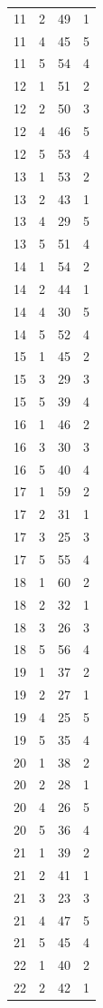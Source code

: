 \documentclass[a4paper, amsfonts, amssymb, amsmath, reprint, showkeys, nofootinbib, twoside]{revtex4-1}
\begin{document}
\begin{longtable}[h!]{ cccc }
	11 & 2 & 49 & 1 \\
	11 & 4 & 45 & 5 \\
	11 & 5 & 54 & 4 \\
	12 & 1 & 51 & 2 \\
	12 & 2 & 50 & 3 \\
	12 & 4 & 46 & 5 \\
	12 & 5 & 53 & 4 \\
	13 & 1 & 53 & 2 \\
	13 & 2 & 43 & 1 \\
	13 & 4 & 29 & 5 \\
	13 & 5 & 51 & 4 \\
	14 & 1 & 54 & 2 \\
	14 & 2 & 44 & 1 \\
	14 & 4 & 30 & 5 \\
	14 & 5 & 52 & 4 \\
	15 & 1 & 45 & 2 \\
	15 & 3 & 29 & 3 \\
	15 & 5 & 39 & 4 \\
	16 & 1 & 46 & 2 \\
	16 & 3 & 30 & 3 \\
	16 & 5 & 40 & 4 \\
	17 & 1 & 59 & 2 \\
	17 & 2 & 31 & 1 \\
	17 & 3 & 25 & 3 \\
	17 & 5 & 55 & 4 \\
	18 & 1 & 60 & 2 \\
	18 & 2 & 32 & 1 \\
	18 & 3 & 26 & 3 \\
	18 & 5 & 56 & 4 \\
	19 & 1 & 37 & 2 \\
	19 & 2 & 27 & 1 \\
	19 & 4 & 25 & 5 \\
	19 & 5 & 35 & 4 \\
	20 & 1 & 38 & 2 \\
	20 & 2 & 28 & 1 \\
	20 & 4 & 26 & 5 \\
	20 & 5 & 36 & 4 \\
	21 & 1 & 39 & 2 \\
	21 & 2 & 41 & 1 \\
	21 & 3 & 23 & 3 \\
	21 & 4 & 47 & 5 \\
	21 & 5 & 45 & 4 \\
	22 & 1 & 40 & 2 \\
	22 & 2 & 42 & 1 \\

\end{longtable}
\end{document}
